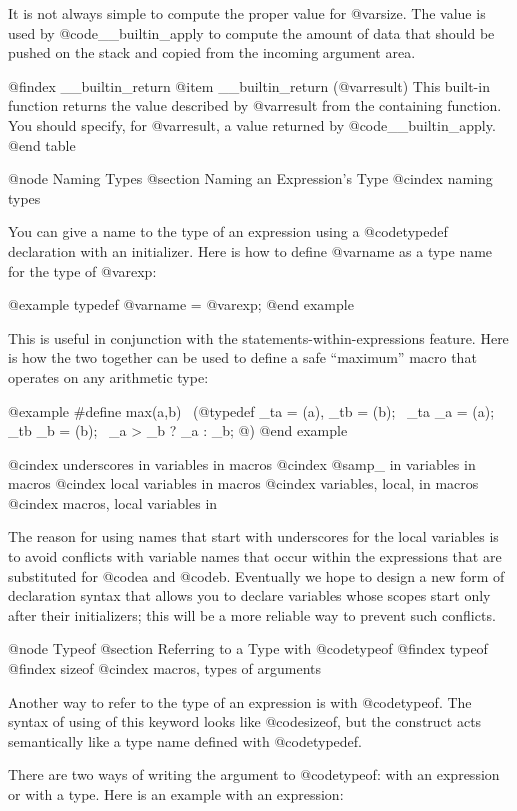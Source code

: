 {It is not always simple to compute the proper value for @var{size}.  The
value is used by @code{__builtin_apply} to compute the amount of data
that should be pushed on the stack and copied from the incoming argument
area.

@findex __builtin_return
@item __builtin_return (@var{result})
This built-in function returns the value described by @var{result} from
the containing function.  You should specify, for @var{result}, a value
returned by @code{__builtin_apply}.
@end table

@node Naming Types
@section Naming an Expression's Type
@cindex naming types

You can give a name to the type of an expression using a @code{typedef}
declaration with an initializer.  Here is how to define @var{name} as a
type name for the type of @var{exp}:

@example
typedef @var{name} = @var{exp};
@end example

This is useful in conjunction with the statements-within-expressions
feature.  Here is how the two together can be used to define a safe
``maximum'' macro that operates on any arithmetic type:

@example
#define max(a,b) \
  (@{typedef _ta = (a), _tb = (b);  \
    _ta _a = (a); _tb _b = (b);     \
    _a > _b ? _a : _b; @})
@end example

@cindex underscores in variables in macros
@cindex @samp{_} in variables in macros
@cindex local variables in macros
@cindex variables, local, in macros
@cindex macros, local variables in

The reason for using names that start with underscores for the local
variables is to avoid conflicts with variable names that occur within the
expressions that are substituted for @code{a} and @code{b}.  Eventually we
hope to design a new form of declaration syntax that allows you to declare
variables whose scopes start only after their initializers; this will be a
more reliable way to prevent such conflicts.

@node Typeof
@section Referring to a Type with @code{typeof}
@findex typeof
@findex sizeof
@cindex macros, types of arguments

Another way to refer to the type of an expression is with @code{typeof}.
The syntax of using of this keyword looks like @code{sizeof}, but the
construct acts semantically like a type name defined with @code{typedef}.

There are two ways of writing the argument to @code{typeof}: with an
expression or with a type.  Here is an example with an expression:

}
